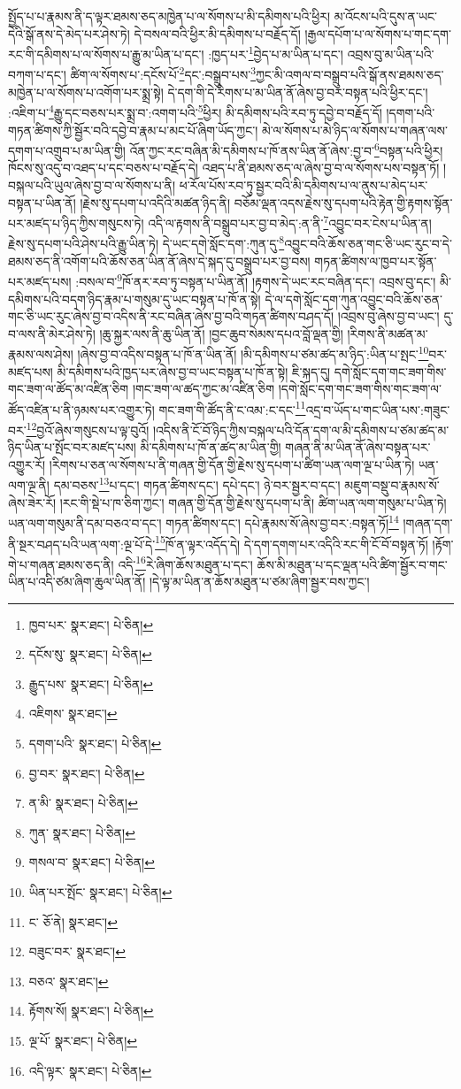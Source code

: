 སྤྱོད་པ་པ་རྣམས་ནི་ད་ལྟར་ཐམས་ཅད་མཁྱེན་པ་ལ་སོགས་པ་མི་དམིགས་པའི་ཕྱིར། མ་འོངས་པའི་དུས་ན་ཡང་དེའི་སྒོ་ནས་དེ་མེད་པར་ཤེས་ཏེ། དེ་བསལ་བའི་ཕྱིར་མི་དམིགས་པ་བརྗོད་དོ། །རྒྱལ་དཔོག་པ་ལ་སོགས་པ་གང་དག་རང་གི་དམིགས་པ་ལ་སོགས་པ་རྒྱུ་མ་ཡིན་པ་དང་། :ཁྱད་པར་\footnote{ཁྱབ་པར་  སྣར་ཐང་།  པེ་ཅིན། }བྱེད་པ་མ་ཡིན་པ་དང་། འབྲས་བུ་མ་ཡིན་པའི་བཀག་པ་དང་། ཚིག་ལ་སོགས་པ་:དངོས་པོ་\footnote{དངོས་སུ་  སྣར་ཐང་།  པེ་ཅིན། }དང་:བསྒྲུབ་པས་\footnote{རྒྱུད་པས་  སྣར་ཐང་།  པེ་ཅིན། }ཀྱང་མི་འགལ་བ་བསྒྲུབ་པའི་སྒོ་ནས་ཐམས་ཅད་མཁྱེན་པ་ལ་སོགས་པ་འགོག་པར་སྨྲ་སྟེ། དེ་དག་གི་དེ་རིགས་པ་མ་ཡིན་ནོ་ཞེས་བྱ་བར་བསྟན་པའི་ཕྱིར་དང་། :འཇིག་པ་\footnote{འཇིགས་  སྣར་ཐང་། }རྒྱུ་དང་བཅས་པར་སྨྲ་བ་:འགག་པའི་\footnote{དགག་པའི་  སྣར་ཐང་།  པེ་ཅིན། }ཕྱིར། མི་དམིགས་པའི་རབ་ཏུ་དབྱེ་བ་བརྗོད་དོ། །དགག་པའི་གཏན་ཚིགས་ཀྱི་སྦྱོར་བའི་དབྱེ་བ་རྣམ་པ་མང་པོ་ཞིག་ཡོད་ཀྱང་། མེ་ལ་སོགས་པ་མེ་ཉིད་ལ་སོགས་པ་གཞན་ལས་དགག་པ་འགྲུབ་པ་མ་ཡིན་གྱི། འོན་ཀྱང་རང་བཞིན་མི་དམིགས་པ་ཁོ་ནས་ཡིན་ནོ་ཞེས་:བྱ་བ་\footnote{བྱ་བར་  སྣར་ཐང་།  པེ་ཅིན། }བསྟན་པའི་ཕྱིར། ཁོངས་སུ་འདུ་བ་འཐད་པ་དང་བཅས་པ་བརྗོད་དེ། འཐད་པ་ནི་ཐམས་ཅད་ལ་ཞེས་བྱ་བ་ལ་སོགས་པས་བསྟན་ཏོ། །བསྐལ་པའི་ཡུལ་ཞེས་བྱ་བ་ལ་སོགས་པ་ནི། ཕ་རོལ་པོས་རབ་ཏུ་སྦྱར་བའི་མི་དམིགས་པ་ལ་ནུས་པ་མེད་པར་བསྟན་པ་ཡིན་ནོ། །རྗེས་སུ་དཔག་པ་འདིའི་མཚན་ཉིད་ནི། བཅོམ་ལྡན་འདས་རྗེས་སུ་དཔག་པའི་རྟེན་གྱི་རྟགས་སྟོན་པར་མཛད་པ་ཉིད་ཀྱིས་གསུངས་ཏེ། འདི་ལ་རྟགས་ནི་བསྒྲུབ་པར་བྱ་བ་མེད་:ན་ནི་\footnote{ན་མི་  སྣར་ཐང་།  པེ་ཅིན། }འབྱུང་བར་ངེས་པ་ཡིན་ན། རྗེས་སུ་དཔག་པའི་ཤེས་པའི་རྒྱུ་ཡིན་ཏེ། དེ་ཡང་དགེ་སློང་དག་:ཀུན་དུ་\footnote{ཀུན་  སྣར་ཐང་།  པེ་ཅིན། }འབྱུང་བའི་ཆོས་ཅན་གང་ཅི་ཡང་རུང་བ་དེ་ཐམས་ཅད་ནི་འགོག་པའི་ཆོས་ཅན་ཡིན་ནོ་ཞེས་དེ་སྐད་དུ་བསྒྲུབ་པར་བྱ་བས། གཏན་ཚིགས་ལ་ཁྱབ་པར་སྟོན་པར་མཛད་པས། :བསལ་བ་\footnote{གསལ་བ་  སྣར་ཐང་།  པེ་ཅིན། }ཁོ་ནར་རབ་ཏུ་བསྟན་པ་ཡིན་ནོ། །རྟགས་དེ་ཡང་རང་བཞིན་དང་། འབྲས་བུ་དང་། མི་དམིགས་པའི་བདག་ཉིད་རྣམ་པ་གསུམ་དུ་ཡང་བསྟན་པ་ཁོ་ན་སྟེ། དེ་ལ་དགེ་སློང་དག་ཀུན་འབྱུང་བའི་ཆོས་ཅན་གང་ཅི་ཡང་རུང་ཞེས་བྱ་བ་འདིས་ནི་རང་བཞིན་ཞེས་བྱ་བའི་གཏན་ཚིགས་བཤད་དོ། །འབྲས་བུ་ཞེས་བྱ་བ་ཡང་། དུ་བ་ལས་ནི་མེར་ཤེས་ཏེ། །ཆུ་སྐྱར་ལས་ནི་ཆུ་ཡིན་ནོ། །བྱང་ཆུབ་སེམས་དཔའ་བློ་ལྡན་གྱི། །རིགས་ནི་མཚན་མ་རྣམས་ལས་ཤེས། །ཞེས་བྱ་བ་འདིས་བསྟན་པ་ཁོ་ན་ཡིན་ནོ། །མི་དམིགས་པ་ཙམ་ཚད་མ་ཉིད་:ཡིན་པ་སྤང་\footnote{ཡིན་པར་སྤོང་  སྣར་ཐང་།  པེ་ཅིན། }བར་མཛད་པས། མི་དམིགས་པའི་ཁྱད་པར་ཞེས་བྱ་བ་ཡང་བསྟན་པ་ཁོ་ན་སྟེ། ཇི་སྐད་དུ། དགེ་སློང་དག་གང་ཟག་གིས་གང་ཟག་ལ་ཚོད་མ་འཛིན་ཅིག །གང་ཟག་ལ་ཚད་ཀྱང་མ་འཛིན་ཅིག །དགེ་སློང་དག་གང་ཟག་གིས་གང་ཟག་ལ་ཚོད་འཛིན་པ་ནི་ཉམས་པར་འགྱུར་ཏེ། གང་ཟག་གི་ཚོད་ནི་ང་འམ་:ང་དང་\footnote{ང་  ཅོ་ནེ།  སྣར་ཐང་། }འདྲ་བ་ཡོད་པ་གང་ཡིན་པས་:གཟུང་བར་\footnote{བཟུང་བར་  སྣར་ཐང་། }བྱའོ་ཞེས་གསུངས་པ་ལྟ་བུའོ། །འདིས་ནི་ངོ་བོ་ཉིད་ཀྱིས་བསྐལ་པའི་དོན་དག་ལ་མི་དམིགས་པ་ཙམ་ཚད་མ་ཉིད་ཡིན་པ་སྤོང་བར་མཛད་པས། མི་དམིགས་པ་ཁོ་ན་ཚད་མ་ཡིན་གྱི། གཞན་ནི་མ་ཡིན་ནོ་ཞེས་བསྟན་པར་འགྱུར་རོ། །རིགས་པ་ཅན་ལ་སོགས་པ་ནི་གཞན་གྱི་དོན་གྱི་རྗེས་སུ་དཔག་པ་ཚིག་ཡན་ལག་ལྔ་པ་ཡིན་ཏེ། ཡན་ལག་ལྔ་ནི། དམ་བཅས་\footnote{བཅའ་  སྣར་ཐང་། }པ་དང་། གཏན་ཚིགས་དང་། དཔེ་དང་། ཉེ་བར་སྦྱར་བ་དང་། མཇུག་བསྡུ་བ་རྣམས་སོ་ཞེས་ཟེར་རོ། །རང་གི་སྡེ་པ་ཁ་ཅིག་ཀྱང་། གཞན་གྱི་དོན་གྱི་རྗེས་སུ་དཔག་པ་ནི། ཚིག་ཡན་ལག་གསུམ་པ་ཡིན་ཏེ། ཡན་ལག་གསུམ་ནི་དམ་བཅའ་བ་དང་། གཏན་ཚིགས་དང་། དཔེ་རྣམས་སོ་ཞེས་བྱ་བར་:བསྟན་ཏོ།\footnote{རྟོགས་སོ།  སྣར་ཐང་།  པེ་ཅིན། } །གཞན་དག་ནི་སྔར་བཤད་པའི་ཡན་ལག་:ལྔ་པོ་དེ་\footnote{ལྔ་པོ་  སྣར་ཐང་།  པེ་ཅིན། }ཁོ་ན་ལྟར་འདོད་དེ། དེ་དག་དགག་པར་འདིའི་རང་གི་ངོ་བོ་བསྟན་ཏོ། །རྟོག་གེ་པ་གཞན་ཐམས་ཅད་ནི། འདི་\footnote{འདི་ལྟར་  སྣར་ཐང་།  པེ་ཅིན། }རེ་ཞིག་ཆོས་མཐུན་པ་དང་། ཆོས་མི་མཐུན་པ་དང་ལྡན་པའི་ཚིག་སྦྱོར་བ་གང་ཡིན་པ་འདི་ཙམ་ཞིག་ཆུལ་ཡིན་ནོ། །དེ་ལྟ་མ་ཡིན་ན་ཆོས་མཐུན་པ་ཙམ་ཞིག་སྦྱར་བས་ཀྱང་། 